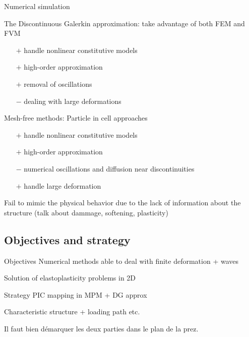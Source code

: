 \begin{frame}{Numerical simulation}
  \begin{block}{The Discontinuous Galerkin approximation: take advantage of both FEM and FVM}
    \begin{itemize}
    \item[$+$] handle nonlinear constitutive models
    \item[$+$] high-order approximation
    \item[$+$] removal of oscillations
    \item[$-$] dealing with large deformations
    \end{itemize}
  \end{block}

  \begin{block}{Mesh-free methods: Particle in cell approaches}
    \begin{itemize}
    \item[$+$] handle nonlinear constitutive models
    \item[$+$] high-order approximation
    \item[$-$] numerical oscillations and diffusion near discontinuities
    \item[$+$] handle large deformation
    \end{itemize}
  \end{block}
  Fail to mimic the physical behavior due to the lack of information about the structure (talk about dammage, softening, plasticity)
\end{frame}

\subsection*{Objectives and strategy}
\begin{frame}{Objectives}
  Numerical methods able to deal with finite deformation + waves

  Solution of elastoplasticity problems in 2D
\end{frame}

\begin{frame}{Strategy}
  PIC mapping in MPM + DG approx

  Characteristic structure + loading path etc.

  Il faut bien démarquer les deux parties dans le plan de la prez.
\end{frame}


